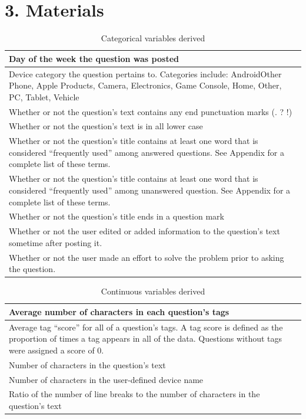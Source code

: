 \documentclass{article}
\begin{document}

\section*{3. Materials}

\begin{table}[!htbp]
\centering
\begin{tabular}{|p{10cm}|}
  \hline
  Day of the week the question was posted \\ \hline
  Device category the question pertains to. Categories include: Android\/Other Phone, Apple Products, Camera, Electronics, Game Console, Home, Other, PC, Tablet, Vehicle \\ \hline
  Whether or not the question's text contains any end punctuation marks (. ? !) \\ \hline
  Whether or not the question's text is in all lower case \\ \hline
  Whether or not the question's title contains at least one word that is considered ``frequently used'' among answered questions. See Appendix for a complete list of these terms. \\ \hline
  Whether or not the question's title contains at least one word that is considered ``frequently used'' among unanswered question. See Appendix for a complete list of these terms. \\ \hline
  Whether or not the question's title ends in a question mark \\ \hline
  Whether or not the user edited or added information to the question's text sometime after posting it. \\ \hline
  Whether or not the user made an effort to solve the problem prior to asking the question. \\ \hline
\end{tabular}
\caption{Categorical variables derived}
\label{table:categorical}
\end{table}

\begin{table}[!htbp]
\centering
\begin{tabular}{|p{10cm}|}
  \hline
  Average number of characters in each question's tags\\ \hline
  Average tag ``score'' for all of a question's tags. A tag score is defined as the proportion of times a tag appears in all of the data. Questions without tags were assigned a score of 0. \\ \hline
  Number of characters in the question's text \\ \hline
  Number of characters in the user-defined device name \\ \hline
  Ratio of the number of line breaks to the number of characters in the question's text \\ \hline
\end{tabular}
\caption{Continuous variables derived}
\label{table:continuous}
\end{table}
\end{document}
